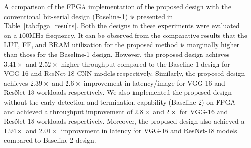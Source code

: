 \documentclass[conference]{IEEEtran}
\begin{document}
A comparison of the FPGA implementation of the proposed design with the conventional bit-serial design (Baseline-1) is presented in Table~\ref{tab:fpga_results}. Both the designs in these experiments were evaluated on a \(100\)MHz frequency. It can be observed from the comparative results that the LUT, FF, and BRAM utilization for the proposed method is marginally higher than those for the Baseline-1 design. However, the proposed design achieves \(3.41\times\) and \(2.52\times\) higher throughput compared to the Baseline-1 design for VGG-16 and ResNet-18 CNN models respectively. Similarly, the proposed design achieves \(2.39\times\) and \(2.6\times\) improvement in latency/image for VGG-16 and ResNet-18 workloads respectively. We also implemented the proposed design without the early detection and termination capability (Baseline-2) on FPGA and achieved a throughput improvement of \(2.8\times\) and \(2\times\) for VGG-16 and ResNet-18 workloads respectively. Moreover, the proposed design also achieved a \(1.94\times\) and \(2.01\times\) improvement in latency for VGG-16 and ResNet-18 models compared to Baseline-2 design.
\end{document}
